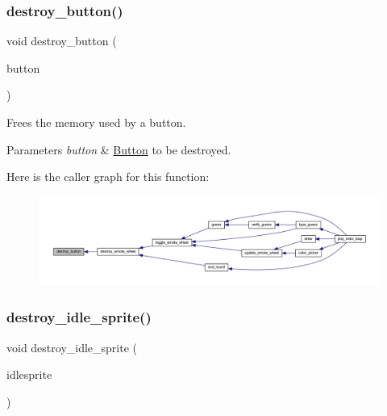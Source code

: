 \subsubsection{\texorpdfstring{destroy\+\_\+button()}{destroy\_button()}}
{\footnotesize\ttfamily void destroy\+\_\+button (\begin{DoxyParamCaption}\item[{\mbox{\hyperlink{struct_button}{Button}} $\ast$}]{button }\end{DoxyParamCaption})}



Frees the memory used by a button. 


\begin{DoxyParams}{Parameters}
{\em button} & \mbox{\hyperlink{struct_button}{Button}} to be destroyed. \\
\hline
\end{DoxyParams}
Here is the caller graph for this function\+:\nopagebreak
\begin{figure}[H]
\begin{center}
\leavevmode
\includegraphics[width=350pt]{group__sprite_ga6b75c612ee123b9b3261a831fd6d805b_icgraph}
\end{center}
\end{figure}
\mbox{\label{group__sprite_ga61aab38a0e3013985ea15998cc898846}} 
\subsubsection{\texorpdfstring{destroy\+\_\+idle\+\_\+sprite()}{destroy\_idle\_sprite()}}
{\footnotesize\ttfamily void destroy\+\_\+idle\+\_\+sprite (\begin{DoxyParamCaption}\item[{\mbox{\hyperlink{struct_idle_sprite}{Idle\+Sprite}} $\ast$}]{idlesprite }\end{DoxyParamCaption})}



